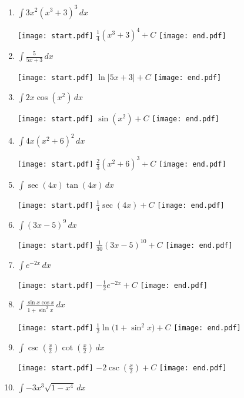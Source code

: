 \documentclass[12pt]{article}
\begin{document}
\begin{enumerate}

\item $\int 3x^2(x^3+3)^3 \,dx$ 

\texttt{[image: start.pdf]}
{{$\frac{1}{4}(x^3+3)^4+C$}}
\texttt{[image: end.pdf]}


\item $\int \frac{5}{5x+3} \,dx$ 

\texttt{[image: start.pdf]}
{{$\ln{|5x+3|}+C$}}
\texttt{[image: end.pdf]}


\item $\int 2x\cos{(x^2)} \,dx$ 

\texttt{[image: start.pdf]}
{{$\sin{(x^2)}+C$}}
\texttt{[image: end.pdf]}


\item $\int 4x(x^2+6)^2 \,dx$ 

\texttt{[image: start.pdf]}
{{$\frac{2}{3}(x^2+6)^3+C$}}
\texttt{[image: end.pdf]}


\item $\int \sec{(4x)}\tan{(4x)} \,dx$ 

\texttt{[image: start.pdf]}
{{$\frac{1}{4}\sec{(4x)}+C$}}
\texttt{[image: end.pdf]}


\item $\int (3x-5)^{9} \,dx$ 

\texttt{[image: start.pdf]}
{{$\frac{1}{30}(3x-5)^{10}+C$}}
\texttt{[image: end.pdf]}


\item $\int e^{-2x} \,dx$ 

\texttt{[image: start.pdf]}
{{$-\frac{1}{2}e^{-2x}+C$}}
\texttt{[image: end.pdf]}


\item $\int \frac{\sin{x}\cos{x}}{1+\sin^{2}{x}} \,dx$ 

\texttt{[image: start.pdf]}
{{$\frac{1}{2}\ln{(1+\sin^2{x}})+C$}}
\texttt{[image: end.pdf]}


\item $\int \csc{\left(\frac{x}{2}\right)}\cot{\left(\frac{x}{2}\right)} \,dx$ 

\texttt{[image: start.pdf]}
{{$-2\csc{\left(\frac{x}{2}\right)}+C$}}
\texttt{[image: end.pdf]}


\item $\int -3x^3\sqrt{1-x^4} \,dx$ 


\end{enumerate}
\end{document}
